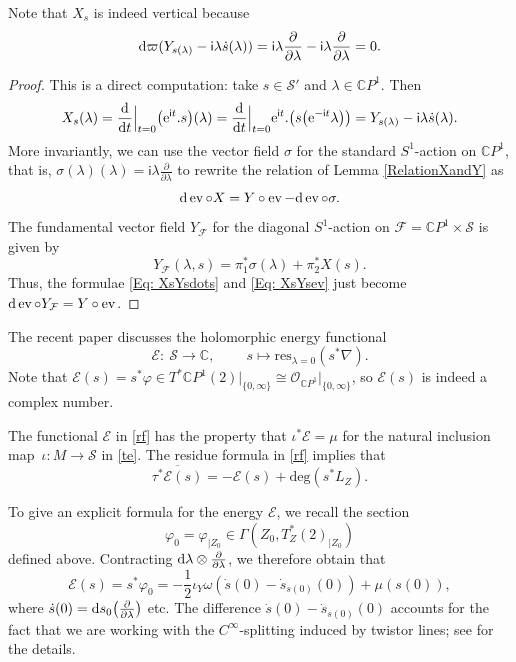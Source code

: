 \documentclass[pdftex]{sigma}
\numberwithin{equation}{section}
\theoremstyle{definition}
\newcommand\C{{\mathbb C}}
\renewcommand{\i}{\mathsf{i}}
\begin{document}
Note that $X_s$ is indeed vertical because
\[{\rm d}\varpi(Y_{s(\lambda)} -\i \lambda\dot{s}(\lambda)) = \i \lambda\frac{\partial}{\partial\lambda} -\i
\lambda\frac{\partial}{\partial\lambda} = 0 .
\]

\begin{proof}
This is a direct computation: take $s \in \mathcal S'$ and $\lambda \in \C P^1$. Then
\[
X_s(\lambda) = \frac{\rm d}{{\rm d}t}\Big\vert_{t=0} \bigl({\rm e}^{\i t}.s\bigr)(\lambda)
 = \frac{\rm d}{{\rm d}t}\Big\vert_{t=0} {\rm e}^{\i t}.\bigl(s\bigl({\rm e}^{-\i t}\lambda\bigr)\bigr)
 = Y_{s(\lambda)} -\i \lambda\dot{s}(\lambda).
\]
More invariantly, we can use the vector field $\sigma$ for the standard $S^1$-action on $\C P^1$, that is,
$\sigma(\lambda)(\lambda) = \i\lambda\frac{\partial}{\partial \lambda}$ to rewrite the relation of Lemma \ref{RelationXandY} as
\begin{equation}\label{Eq: XsYsev}
{\rm d}\operatorname{ev}\circ X = Y\circ\operatorname{ev} - {\rm d}\operatorname{ev}\circ \sigma.
\end{equation}
The fundamental vector field $Y_{\mathcal F}$ for the diagonal $S^1$-action on $\mathcal F
 = \C P^1 \times \mathcal S$ is given by
\[
Y_{\mathcal F}(\lambda,s) = \pi_1^*\sigma(\lambda) + \pi_2^*X(s).
\]
Thus, the formulae \eqref{Eq: XsYsdots} and \eqref{Eq: XsYsev} just become
${\rm d}\operatorname{ev}\circ Y_{\mathcal{F}} = Y\circ \operatorname{ev}$.
\end{proof}

The recent paper \cite{BeHeRo} discusses the holomorphic
energy functional
\begin{equation}\label{rf}
\mathcal E\colon\ \mathcal S \longrightarrow \C,\ \qquad s \longmapsto
 \mathrm{res}_{\lambda=0}(s^*\nabla).
\end{equation}
Note that $\mathcal E(s) = s^*\varphi \in T^*\C P^1(2)\big\vert_{\{0,\infty\}}
 \cong \mathcal{O}_{\C P^1}|_{\{0,\infty\}}$, so ${\mathcal E}(s)$ is indeed a complex number.

The functional $\mathcal E$ in \eqref{rf} has the property that $\iota^*\mathcal E = \mu$ for the natural inclusion
map~${\iota \colon M
 \longrightarrow \mathcal{S}}$ in \eqref{te}. The residue formula in \eqref{rf} implies that
\begin{equation}\label{EnergyResidue}
\overline{\tau^*\mathcal{E}(s)} = -\mathcal{E}(s) + \mathrm{deg}(s^*L_Z).
\end{equation}

To give an explicit formula for the energy $\mathcal{E}$, we recall the section
\[\varphi_0 = \varphi_{|Z_0} \in
\Gamma(Z_0, T_Z^*(2)_{|Z_0})\]
 defined above. Contracting ${\rm d}\lambda \otimes \frac{\partial}{\partial
\lambda}$, we therefore obtain that
\[%
\mathcal{E}(s) = s^* \varphi_0 = -\frac{1}{2} \iota_Y\omega \left(\dot{s}(0)- \dot{s}_{s(0)}(0)\right) + \mu(s(0)),
\]
where $\dot{s}(0) = {\rm d}s_0\bigl(\frac{\partial}{\partial \lambda}\bigr)$ etc.
The difference $\dot{s}(0) - \dot{s}_{s(0)}(0)$ accounts for the fact that we are working with
the $C^\infty$-splitting induced by twistor lines; see \cite{BeHeRo} for the details.
\end{document}
